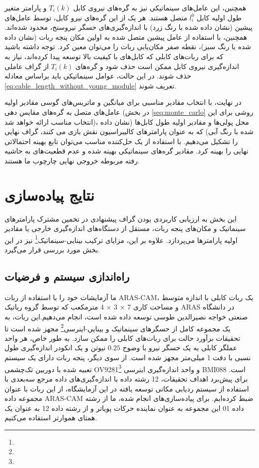 همچنین، این عامل‌های سینماتیکی نیز به گره‌های نیروی کابل
$T_i(k)$
و پارامتر متغیر طول اولیه کابل
$l_{i}^0$
 متصل هستند. هر یک از این گره‌های نیرو کابل، توسط عامل‌های پیشین (نشان داده شده با رنگ زرد) با اندازه‌گیری‌های حسگر نیروسنج، محدود شده‌اند. همچنین، با استفاده از عامل پیشین متصل شده به اولین مکان پنجه ربات (نشان داده شده با رنگ سبز)، نقطه صفر مکان‌یابی ربات را می‌توان معین کرد. توجه داشته باشید که برای ربات‌های کابلی که کابل‌های با کیفیت بالا توسعه پیدا کرده‌اند، نیاز به اندازه‌گیری نیروی کابل ممکن است حذف شود و گره‌های
$T_i(k)$
از گراف عاملی حذف شوند. در این حالت، عوامل سینماتیکی باید براساس معادله
\ref{eq:cable_length_without_young_module}
تعریف شوند. 

در نهایت، با انتخاب مقادیر مناسبی برای میانگین و ماتریس‌های گوسی مقادیر اولیه عامل‌های متصل به گره‌های مقایس دهی (در بخش 
\ref{seq:monte_carlo}
روشی برای این انتخاب مناسب ارائه خواهد شد)، محل پولی‌ها و مقادیر اولیه طول کابل‌ها (نشان‌ داده شده با رنگ آبی) که به عنوان پارامترهای کالیبراسیون نقش بازی می کنند، گراف نهایی را تشکیل می‌دهیم. با استفاده از یک حل‌کننده مناسب می‌توان تابع بهینه‌ احتمالاتی نهایی را بهینه کرد. مقادیر گره‌های سینماتیکی بهینه شده و عدم قطعیت‌های به حاشیه رفته مربوطه خروجی نهایی چارچوب ما هستند.

\section{نتایج پیاده‌سازی}
این بخش به ارزیابی کاربردی بودن گراف پیشنهادی در تخمین مشترک پارامترهای سینماتیک و مکان‌های پنجه ربات، مستقل از دستگاه‌های اندازه‌گیری خارجی یا مقادیر اولیه پارامترها می‌پردازد. علاوه بر این، مزایای ترکیب بینایی-سینماتیک\footnote{}
 نیز در این بخش مورد بررسی قرار می‌گیرد.

\subsection{راه‌اندازی سیستم و فرضیات}
ما آزمایشات خود را با استفاده از ربات ARAS-CAM، یک ربات کابلی با اندازه متوسط و مساحت کاری 7 × 3 × 4 مترمکعب که توسط گروه رباتیک ARAS در دانشگاه صنعتی خواجه نصیرالدین طوسی توسعه داده شده است، انجام می‌دهیم.این ربات، به یک مجموعه کامل از حسگرهای سینماتیک و بینایی-اینرسی\footnote{}
 مجهز شده است تا تحقیقات برآورد حالت برای ربات‌های کابلی را ممکن سازد. به طور خاص، هر واحد عملگر کابلی به یک حسگر نیرو با وضوح 
 $0.25$
  نیوتن و یک انکودر اندازه‌گیری طول نسبی با دقت 1 میلی‌متر مجهز شده است. از سوی دیگر، پنجه ربات دارای یک سیستم تعبیه شده با دوربین تک‌چشمی OV9281\footnote{}
 و واحد اندازه‌گیری اینرسی BMI088 است. برای پیش‌برد اهداف تحقیقات، 12 رشته داده با اندازه‌گیری‌های داده مرجع سه‌بعدی با استفاده از سیستم ردیابی مکانی توسعه یافته در این آزمایشگاه، از این ربات با عنوان مجموعه داده ARAS-CAM ضبط کرده‌ایم. برای پیاده‌سازی‌های انجام شده، ما از رشته داده 01 این مجموعه به عنوان نماینده حرکات پویاتر و از رشته داده 12 به عنوان یک همتای هموارتر استفاده می‌کنیم.

